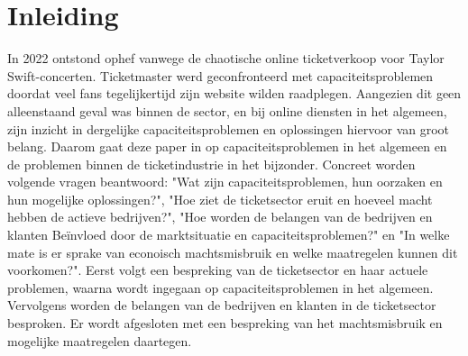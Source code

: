 
\section{Inleiding}

In 2022 ontstond ophef vanwege de chaotische online ticketverkoop voor 
Taylor Swift-concerten. Ticketmaster %
werd geconfronteerd met capaciteitsproblemen doordat veel fans %
tegelijkertijd zijn website wilden raadplegen. Aangezien dit geen alleenstaand 
geval was binnen de sector, en bij online diensten in het algemeen, zijn inzicht in 
dergelijke capaciteitsproblemen en oplossingen hiervoor van groot belang. %
Daarom %
gaat deze paper in op capaciteitsproblemen in het algemeen en de problemen 
binnen de ticketindustrie in het bijzonder. Concreet worden volgende vragen 
beantwoord: "Wat zijn capaciteitsproblemen, hun oorzaken %
en hun mogelijke oplossingen?", "Hoe ziet de ticketsector eruit en hoeveel macht hebben de 
actieve bedrijven?", "Hoe worden de belangen van de bedrijven en klanten 
Beïnvloed %
door de marktsituatie en capaciteitsproblemen?" en 
"In welke mate is er sprake van econoisch machtsmisbruik en welke maatregelen 
kunnen dit voorkomen?". %
Eerst volgt een bespreking van de ticketsector en 
haar actuele problemen, waarna wordt ingegaan op capaciteitsproblemen 
in het algemeen. Vervolgens worden de belangen van de bedrijven en klanten 
in de ticketsector besproken. Er wordt afgesloten met een bespreking van het 
machtsmisbruik en mogelijke maatregelen daartegen. 